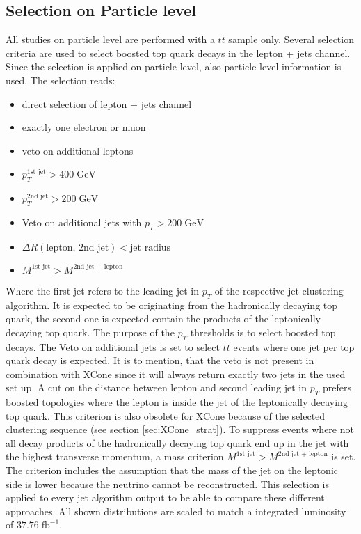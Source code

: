 \subsection{Selection on Particle level}
\label{sec:GenSel}
	All studies on particle level are performed with a $t\bar{t}$ sample only. Several selection criteria are used to select boosted top quark decays in the lepton + jets channel. Since the selection is applied on particle level, also particle level information is used. The selection reads:
	\begin{itemize}
	\item direct selection of lepton + jets channel
	\item exactly one electron or muon
	\item veto on additional leptons
	\item $p_T^{\text{1st jet}} > 400\;\text{GeV}$ 
	\item $p_T^{\text{2nd jet}} > 200\;\text{GeV}$ 
	\item Veto on additional jets with $p_T > 200\;\text{GeV}$ 
	\item $\Delta R (\text{lepton, 2nd jet}) < \text{jet radius}$
	\item $M^{\text{1st jet}} > M^{\text{2nd jet + lepton}}$
	\end{itemize}
	Where the first jet refers to the leading jet in $p_T$ of the respective jet clustering algorithm. It is expected to be originating from the hadronically decaying top quark, the second one is expected contain the products of the leptonically decaying top quark. The purpose of the $p_T$ thresholds is to select boosted top decays. The Veto on additional jets is set to select $t\bar{t}$ events where one jet per top quark decay is expected. It is to mention, that the veto is not present in combination with XCone since it will always return exactly two jets in the used set up. A cut on the distance between lepton and second leading jet in $p_T$ prefers boosted topologies where the lepton is inside the jet of the leptonically decaying top quark. This criterion is also obsolete for XCone because of the selected clustering sequence (see section \ref{sec:XCone_strat}). To suppress events where not all decay products of the hadronically decaying top quark end up in the jet with the highest transverse momentum, a mass criterion $M^{\text{1st jet}} > M^{\text{2nd jet + lepton}}$ is set. The criterion includes the assumption that the mass of the jet on the leptonic side is lower because the neutrino cannot be reconstructed. This selection is applied to every jet algorithm output to be able to compare these different approaches. All shown distributions are scaled to match a integrated luminosity of $37.76\;\text{fb}^{-1}$.

